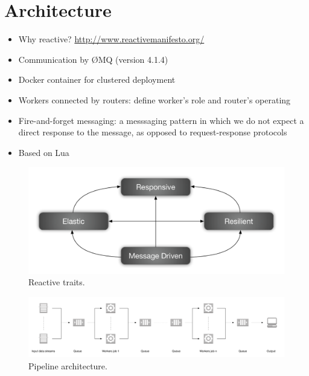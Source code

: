 \section{Architecture}
\label{sec:architecture}

\begin{itemize}
  \item Why reactive?
    \url{http://www.reactivemanifesto.org/}
  \item Communication by ØMQ (version 4.1.4)
  \item Docker container for clustered deployment
  \item Workers connected by routers: define worker's role and router's operating
  \item Fire-and-forget messaging: a messsaging pattern in which we do not expect a direct response to the message, as opposed to request-response protocols
  \item Based on Lua
\end{itemize}

\begin{figure}[t!]
  \centering
  \includegraphics[width=.99\linewidth]{images/reactive-traits}
  \caption{Reactive traits.}
  \label{fig:reactive-traits}
\end{figure}

\begin{figure}
  \centering
  \includegraphics[width=.99\textwidth]{images/architecture_pipeline}
  \caption{Pipeline architecture.}
  \label{fig:architecture_pipeline}
\end{figure}
